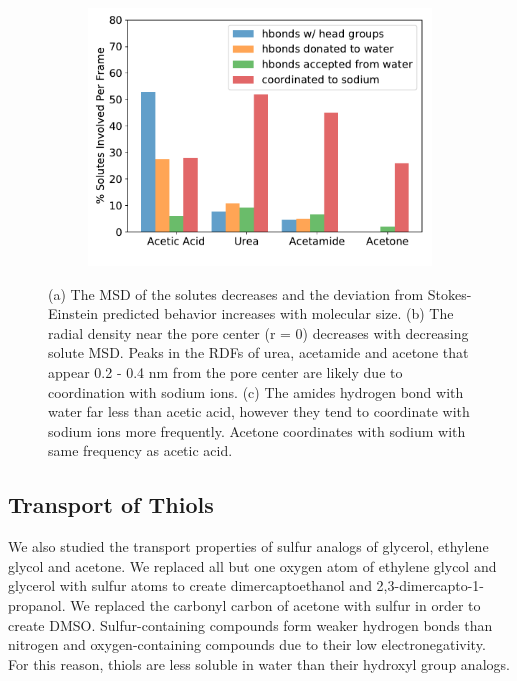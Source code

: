 \documentclass[journal=jpcbfk,manuscript=article]{achemso}
\begin{document}
\begin{figure}[!htb]
\begin{subfigure}{0.325\textwidth}
  \includegraphics[width=\textwidth]{ketone_hbonds.pdf}  %
  \caption{}\label{fig:ketone_hbonds}
  \end{subfigure}
  \caption{(a) The MSD of the solutes decreases and the deviation from
  Stokes-Einstein predicted behavior increases with molecular size.
  (b) The radial density near the pore center (r = 0) decreases with decreasing
  solute MSD. Peaks in the RDFs of urea, acetamide and acetone that appear 
  0.2 - 0.4 nm from the pore center are 
  likely due to coordination with sodium
  ions. (c) The amides hydrogen bond with water far less than acetic acid, 
  however they tend to coordinate with sodium ions more frequently. Acetone
  coordinates with sodium with same frequency as acetic acid.}\label{fig:ketones}
  \end{figure}
  
  \subsection{Transport of Thiols}
  
  We also studied the transport properties of sulfur analogs of glycerol,
  ethylene glycol and acetone. We replaced all but one oxygen atom of 
  ethylene glycol and glycerol with sulfur atoms to create dimercaptoethanol
  and 2,3-dimercapto-1-propanol. We replaced the carbonyl carbon of acetone
  with sulfur in order to create DMSO. Sulfur-containing compounds form weaker
  hydrogen bonds than nitrogen and oxygen-containing compounds due to their
  low electronegativity.~\cite{biswal_hydrogen_2015} For this reason, thiols
  are less soluble in water than their hydroxyl group analogs.
  
\end{document}
